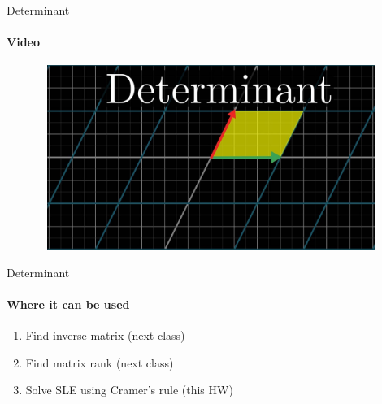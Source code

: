 \documentclass[aspectratio=169,notes]{beamer}
\begin{document}
\begin{frame}[t]{Determinant}
    \framesubtitle{Video}
    \vspace{-0.6cm}
    \begin{figure}[H]
        \href{https://youtu.be/Ip3X9LOh2dk}{
            \centering\includegraphics[height=6cm,width=1\textwidth,keepaspectratio]{det_brown.jpg}}
        \label{fig:det_brown.jpg}
    \end{figure}
\end{frame}

\begin{frame}[t]{Determinant}
\framesubtitle{Where it can be used}
    \begin{enumerate}
        \item Find inverse matrix (next class)
        \item Find matrix rank (next class)
        \item Solve SLE using Cramer's rule (this HW)
    \end{enumerate}
\end{frame}
\end{document}

